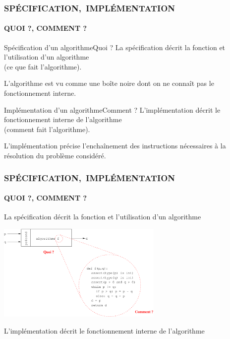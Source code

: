 \begin{frame}
\frametitle{\mbox{\uppercase{Spécification, implémentation}}}
\framesubtitle{\uppercase{Quoi ?, Comment ?}}
\begin{block}{Spécification d'un algorithme\hfill Quoi ?}
La spécification décrit la fonction et l'utilisation d'un algorithme\\
(\alert{ce que fait l'algorithme}).

L'algorithme est vu comme une boîte noire dont on ne connaît pas le
fonctionnement interne.
\end{block}
\begin{block}{Implémentation d'un algorithme\hfill Comment ?}
L'implémentation décrit le fonctionnement interne de l'algorithme\\
(\alert{comment fait l'algorithme}).

L'implémentation précise l'enchaînement des instructions nécessaires
à la résolution du problème considéré.
\end{block}

\end{frame}

\begin{frame}
\frametitle{\mbox{\uppercase{Spécification, implémentation}}}
\framesubtitle{\uppercase{Quoi ?, Comment ?}}
\footnotesize
La spécification décrit la fonction et l'utilisation d'un algorithme
\null\vfill

\centerline{\includegraphics[width=8cm]{algo.pdf}}
\null\vfill 

\mbox{}\hfill L'implémentation décrit le fonctionnement interne de l'algorithme
\end{frame}\note{}

